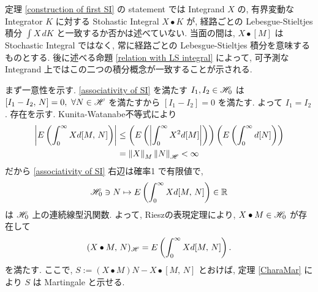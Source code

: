 \documentclass{ltjsarticle}
\begin{document}
\begin{rem}
	定理 \ref{construction of first SI} の statement では Integrand \( X \) の, 有界変動な Integrator \( K \) に対する Stohastic Integral \( X \bullet K \) が,
	経路ごとの Lebesgue-Stieltjes 積分 \( \int X \, dK \) と一致するか否かは述べていない. 当面の間は, \( X \bullet [M] \) は Stochastic Integral ではなく, 常に経路ごとの Lebesgue-Stieltjes 積分を意味するものとする. 
	後に述べる命題 \ref{relation with LS integral} によって, 可予測な Integrand 上ではこの二つの積分概念が一致することが示される.
	\fin\end{rem}

\begin{prf}
	まず一意性を示す.
	\eqref{associativity of SI} を満たす \( I_1, I_2 \in \mathscr{H}_0 \) は
	\( [I_1 - I_2 ,\, N ] = 0,\,\, \forall N \in \mathscr{H} \)
	を満たすから \( [I_1 - I_2] = 0 \) を満たす. よって \( I_1 = I_2 \).
	存在を示す.
	Kunita-Watanabe不等式により
	\begin{align*}
		\left| E \left( \int_0^{\infty} X d[M,\,N] \right) \right|
		 & \le
		\left( E \left( \left| \int_0^{\infty} X^2 d[M] \right| \right) \right)
		\left( E \left( \int_0^{\infty} d[N] \right) \right)
		\\
		 & =	
		\left\| X \right\|_{M} \left\| N \right\|_{\mathscr{H}}	<	\infty		
	\end{align*}
	だから \eqref{associativity of SI} 右辺は確率1 で有限値で,
	\[
		\mathscr{H}_0 \ni N \mapsto E \left( \int_0^{\infty} X d[M,\,N] \right) \in \mathbb{R}
	\]
	は \( \mathscr{H}_0 \) 上の連続線型汎関数.
	よって, Rieszの表現定理により, \( X \bullet M \in \mathscr{H}_0 \) が存在して
	\[
		( X \bullet M,\, N )_{\mathscr{H}} = E \left( \int_0^{\infty} X d[M,\,N] \right).
	\]
	を満たす.
	ここで, \( S := ( X \bullet M )N - X \bullet [M,\,N] \) とおけば,
	定理 \ref{CharaMar} により \( S \) は Martingale と示せる.
	

\end{prf}
\end{document}
